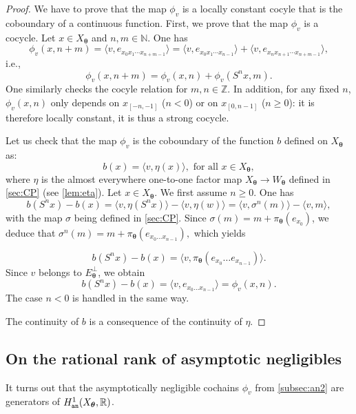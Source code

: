 \documentclass{article}
\theoremstyle{definition}
\newcommand{\Z}{\mathbb{Z}}
\newcommand{\btheta}{\boldsymbol{\theta}}
\begin{document}
\begin{proof}
We have to prove that   the map $\phi_v$  is a locally constant cocyle that is  the coboundary of a continuous function. 
First, we prove that   the map $\phi_v$  is a cocycle.   Let $x \in X_{\btheta}$ and $n,m \in {\mathbb N}$. One has
$$\phi_v(x,n+m)= \langle v, e_{x_0 x_1 \cdots x_{n+m-1}} \rangle= \langle v, e_{x_0 x_1 \cdots x_{n-1}} \rangle+ \langle v, e_{x_n x_{n+1} \cdots x_{n+m-1}} \rangle,$$
i.e.,
$$\phi_v(x,n+m)=\phi_v(x,n)+\phi_v(S^nx,m).$$
One similarly checks the cocyle relation for $m,n \in \Z$.
In addition, for any  fixed $n$,  $ \phi_v (x,n)$  only depends on $x_{[-n,-1]}$ ($n<0$) or on  $x_{[0,n-1]}$ ($n\geq0$): it is therefore locally constant, it is thus a strong cocycle.

Let us  check that the map  $\phi_v$  is the coboundary of the function $b$ defined  on $X_{\btheta}$ as:
\[
 b(x) = \langle v, \eta(x) \rangle, \mbox{ for all }  x  \in X_{\btheta},
\]
where $\eta$ is the almost everywhere one-to-one factor map $X_{\btheta} \rightarrow W_{\btheta}$ defined in \cref{sec:CP} (see \cref{lem:eta}).
Let $x \in X_{\btheta}$. We  first assume $ n\geq 0$.
One has 
$$
 b(S^nx)-b(x)  = \langle v, \eta(S^nx) \rangle- \langle v, \eta(w) \rangle=   \langle v, \sigma^n(m) \rangle- \langle v, m \rangle,
$$
with the map $\sigma$ being defined in \cref{sec:CP}.
Since $\sigma(m)=m+\pi_{\btheta}(e_{x_0})$, we deduce that  $\sigma^n(m)=m+\pi_{\btheta}(e_{x_0\dots x_{n-1}}),$ 
which yields

$$b(S^nx)-b(x)= \langle v, \pi_{\btheta}(e_{x_0}\dots e_{x_{n-1}}) \rangle.$$
Since $v$ belongs to $E_{\btheta}^\perp$, we obtain
$$b(S^nx)-b(x)= \langle v, e_{x_0\dots x_{n-1}} \rangle=\phi_v(x, n).$$
The case $n <0$ is  handled in  the same way.

The continuity of $b$ is a consequence of the continuity of $\eta$.

\end{proof}

\subsection{On the rational  rank of asymptotic negligibles}

It turns out that the   asymptotically negligible cochains $\phi_v$ from \cref{subsec:an2} are generators of  $H^1_{\tt an}(X_{\btheta},\mathbb R)$.
\end{document}
